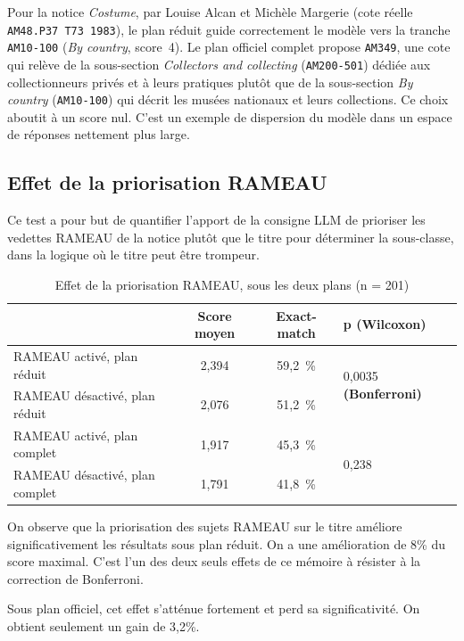 Pour la notice \emph{Costume}, par Louise Alcan et Michèle Margerie (cote réelle \texttt{AM48.P37~T73~1983}), le plan réduit guide correctement le modèle vers la tranche \texttt{AM10-100} (\textit{By country}, score~4). Le plan officiel complet propose \texttt{AM349}, une cote qui relève de la sous-section \textit{Collectors and collecting} (\texttt{AM200-501}) dédiée aux collectionneurs privés et à leurs pratiques plutôt que de la sous-section \textit{By country} (\texttt{AM10-100}) qui décrit les musées nationaux et leurs collections. Ce choix aboutit à un score nul. C'est un exemple de dispersion du modèle dans un espace de réponses nettement plus large.

\subsection{Effet de la priorisation RAMEAU}
\label{sec:effet-rameau}

Ce test a pour but de quantifier l'apport de la consigne LLM de prioriser les vedettes RAMEAU de la notice plutôt que le titre pour déterminer la sous-classe, dans la logique où le titre peut être trompeur.

\begin{table}[h]
\centering
\begin{tabular}{lccl}
\toprule
& \textbf{Score moyen} & \textbf{Exact-match} & \textbf{p (Wilcoxon)} \\
\midrule
RAMEAU activé, plan réduit & 2,394 & 59,2~\% & \multirow{2}{*}{0,0035 \textbf{(Bonferroni)}} \\
RAMEAU désactivé, plan réduit & 2,076 & 51,2~\% & \\
\midrule
RAMEAU activé, plan complet & 1,917 & 45,3~\% & \multirow{2}{*}{0,238} \\
RAMEAU désactivé, plan complet & 1,791 & 41,8~\% & \\
\bottomrule
\end{tabular}
\caption{Effet de la priorisation RAMEAU, sous les deux plans (n = 201)}
\label{tab:rameau-on-off}
\end{table}


On observe que la priorisation des sujets RAMEAU sur le titre améliore significativement les résultats sous plan réduit. On a une amélioration de 8\% du score maximal. C'est l'un des deux seuls effets de ce mémoire à résister à la correction de Bonferroni.

Sous plan officiel, cet effet s'atténue fortement et perd sa significativité. On obtient seulement un gain de 3,2\%.

